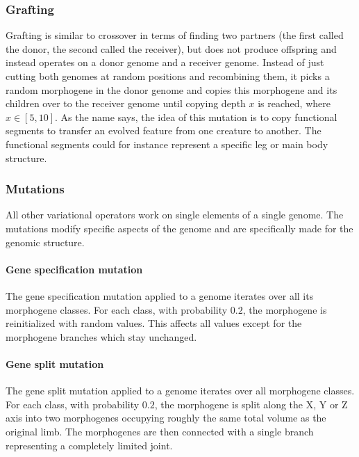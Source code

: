 \documentclass[main]{subfiles}
\begin{document}
\subsubsection{Grafting}

Grafting is similar to crossover in terms of finding two partners (the first called the donor, the second called the receiver), but does not produce offspring and instead operates on a donor genome and a receiver genome. %
%
Instead of just cutting both genomes at random positions and recombining them, it picks a random morphogene in the donor genome and copies this morphogene and its children over to the receiver genome until copying depth $x$ is reached, where $x \in [5,10]$. %
%
As the name says, the idea of this mutation is to copy functional segments to transfer an evolved feature from one creature to another. %
%
The functional segments could for instance represent a specific leg or main body structure.

\subsubsection{Mutations}

All other variational operators work on single elements of a single genome. %
%
The mutations modify specific aspects of the genome and are specifically made for the genomic structure.

\paragraph{Gene specification mutation}

The gene specification mutation applied to a genome iterates over all its morphogene classes. %
%
For each class, with probability $0.2$, the morphogene is reinitialized with random values. %
%
This affects all values except for the morphogene branches which stay unchanged.

\paragraph{Gene split mutation}

The gene split mutation applied to a genome iterates over all morphogene classes. %
%
For each class, with probability $0.2$, the morphogene is split along the X, Y or Z axis into two morphogenes occupying roughly the same total volume as the original limb. %
%
The morphogenes are then connected with a single branch representing a completely limited joint.
\end{document}
